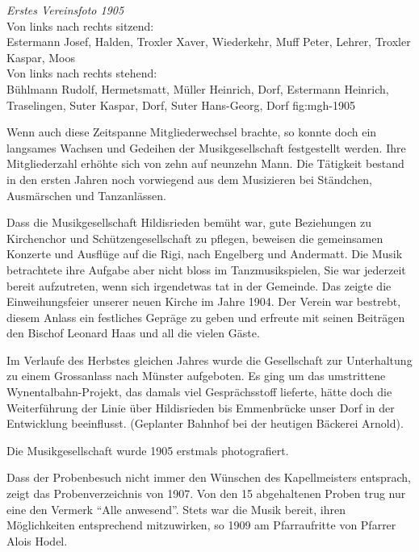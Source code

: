 

{\emph{Erstes Vereinsfoto 1905}\\
    Von links nach rechts sitzend:\\
    Estermann Josef, Halden, Troxler Xaver, Wiederkehr, Muff Peter, Lehrer,
    Troxler Kaspar, Moos\\
    Von links nach rechts stehend:\\
    Bühlmann Rudolf, Hermetsmatt, Müller Heinrich, Dorf, Estermann Heinrich,
    Traselingen, Suter Kaspar, Dorf, Suter Hans-Georg, Dorf} {fig:mgh-1905}

\begin{history}

    Wenn auch diese Zeitspanne Mitgliederwechsel brachte, so konnte doch ein
    langsames Wachsen und Gedeihen der Musikgesellschaft festgestellt werden.
    Ihre Mitgliederzahl erhöhte sich von zehn auf neunzehn Mann. Die Tätigkeit
    bestand in den ersten Jahren noch vorwiegend aus dem Musizieren bei
    Ständchen, Ausmärschen und Tanzanlässen.

    Dass die Musikgesellschaft Hildisrieden bemüht war, gute Beziehungen zu
    Kirchenchor und Schützengesellschaft zu pflegen, beweisen die gemeinsamen
    Konzerte und Ausflüge auf die Rigi, nach Engelberg und Andermatt. Die Musik
    betrachtete ihre Aufgabe aber nicht bloss im Tanzmusikspielen, Sie war
    jederzeit bereit aufzutreten, wenn sich irgendetwas tat in der Gemeinde. Das
    zeigte die Einweihungsfeier unserer neuen Kirche im Jahre 1904. Der Verein
    war bestrebt, diesem Anlass ein festliches Gepräge zu geben und erfreute mit
    seinen Beiträgen den Bischof Leonard Haas und all die vielen Gäste.

    Im Verlaufe des Herbstes gleichen Jahres wurde die Gesellschaft zur
    Unterhaltung zu einem Grossanlass nach Münster aufgeboten. Es ging um das
    umstrittene Wynentalbahn-Projekt, das damals viel Gesprächsstoff lieferte,
    hätte doch die Weiterführung der Linie über Hildisrieden bis Emmenbrücke
    unser Dorf in der Entwicklung beeinflusst. (Geplanter Bahnhof bei der
    heutigen Bäckerei Arnold).

    Die Musikgesellschaft wurde 1905 erstmals photografiert.

    Dass der Probenbesuch nicht immer den Wünschen des Kapellmeisters entsprach,
    zeigt das Probenverzeichnis von 1907. Von den 15 abgehaltenen Proben trug
    nur eine den Vermerk \enquote{Alle anwesend}. Stets war die Musik bereit,
    ihren Möglichkeiten entsprechend mitzuwirken, so 1909 am Pfarraufritte von
    Pfarrer Alois Hodel.


\end{history}

